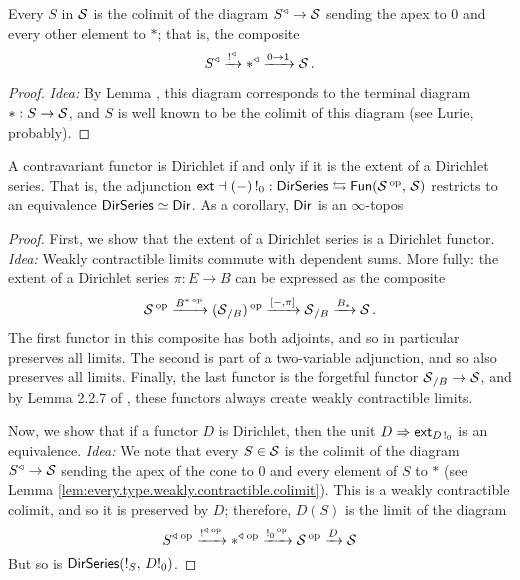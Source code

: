 \begin{lem}\label{lem:every.type.weakly.contractible.colimit}
  Every $S$ in $\operatorname{\mathcal{S}}$ is the colimit of the diagram $S^{\triangleleft} \to \operatorname{\mathcal{S}}$
sending the apex to $0$ and every other element to $\ast$; that is, the
composite
$$S^{\triangleleft} \xrightarrow{\operatorname{!}^{\triangleleft}} \ast^{\triangleleft} \xrightarrow{0 \to
  1} \operatorname{\mathcal{S}}.$$
\end{lem}
\begin{proof}
\emph{Idea:} By Lemma \label{lem:cone.initial.equivalence}, this diagram
corresponds to the terminal diagram $\ast : S \to \operatorname{\mathcal{S}}$, and $S$ is well known to
be the colimit of this diagram (see Lurie, probably).
\end{proof}

\begin{thm}\label{thm:dirichlet.series.functors.equivalence}
  A contravariant functor is Dirichlet if and only if it is the extent of a
  Dirichlet series. That is, the adjunction $\mathsf{{ext}} \dashv (-)\operatorname{!}_0 : \operatorname{\mathsf{{DirSeries}}} \leftrightarrows
  \operatorname{\mathsf{{Fun}}}(\operatorname{\mathcal{S}}\operatorname{^\text{op}},\, \operatorname{\mathcal{S}})$ restricts to an equivalence $\operatorname{\mathsf{{DirSeries}}} \simeq \operatorname{\mathsf{{Dir}}}$. As
  a corollary, $\operatorname{\mathsf{{Dir}}}$ is an $\infty$-topos
\end{thm}
\begin{proof}
  First, we show that the extent of a Dirichlet series is a Dirichlet functor.
  \emph{Idea:} Weakly contractible limits commute with dependent sums. More
  fully: the extent of a Dirichlet series $\pi : E \to B$ can be expressed as
  the composite
  $$\operatorname{\mathcal{S}}\operatorname{^\text{op}} \xrightarrow{B^{\ast}\operatorname{^\text{op}}} (\operatorname{\mathcal{S}}_{/B})\operatorname{^\text{op}} \xrightarrow{[-,\pi]} \operatorname{\mathcal{S}}_{/B} \xrightarrow{B_{\ast}}
  \operatorname{\mathcal{S}}.$$
  The first functor in this composite has both adjoints, and so in particular
  preserves all limits. The second is part of a two-variable adjunction, and so
  also preserves all limits. Finally, the last functor is the forgetful functor
  $\operatorname{\mathcal{S}}_{/B} \to \operatorname{\mathcal{S}}$, and by Lemma 2.2.7 of \cite{GHK:Analytic.Monads}, these
  functors always create weakly contractible limits.

  Now, we show that if a functor $D$ is Dirichlet, then the unit $D \Rightarrow
  \mathsf{{ext}}_{D\operatorname{!}_0}$ is an equivalence.
  \emph{Idea:} We note that every $S \in \operatorname{\mathcal{S}}$ is the colimit of the diagram
  $S^{\triangleleft} \to \operatorname{\mathcal{S}}$ sending the apex of the cone to $0$ and every
  element of $S$ to $\ast$ (see Lemma
  \ref{lem:every.type.weakly.contractible.colimit}). This is a weakly
  contractible colimit, and so it is preserved by $D$; therefore, $D(S)$ is the
  limit of the diagram
  $$S^{\triangleleft}\operatorname{^\text{op}} \xrightarrow{\operatorname{!}^{\triangleleft}\operatorname{^\text{op}}}
  \ast^{\triangleleft}\operatorname{^\text{op}} \xrightarrow{\operatorname{!}_0\operatorname{^\text{op}}} \operatorname{\mathcal{S}}\operatorname{^\text{op}} \xrightarrow{D} \operatorname{\mathcal{S}}$$
  But so is $\operatorname{\mathsf{{DirSeries}}}(!_S,\, D!_0)$.
\end{proof}

